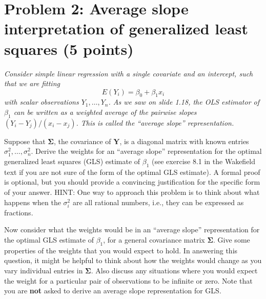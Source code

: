 \documentclass[11pt, letterpaper]{article}
\newcommand{\bY}{{\bm Y}}
\newcommand{\bSigma}{{\bm \Sigma}}
\begin{document}
{\section*{Problem 2: Average slope interpretation of generalized least squares (5 points)}
{\em Consider simple linear regression with a
single covariate and an intercept, such that we are fitting
\[
E(Y_i)=\beta_0 + \beta_1 x_i
\]
with scalar observations $Y_1,\ldots,Y_n$. As we saw on slide 1.18, the OLS estimator of $\beta_1$ can
be written as a weighted average of the pairwise slopes $(Y_i-Y_j)/(x_i-x_j)$.
This is called the ``average slope'' representation.
}
\begin{enumerate}[(a)]
{\em \item Suppose that $\bSigma$, the covariance of $\bY$, is a diagonal matrix with known entries $\sigma_1^2,\ldots,\sigma_n^2$.
Derive the weights for an ``average slope'' representation for the optimal generalized least squares (GLS) estimate of $\beta_1$ (see exercise 8.1 in the Wakefield text if you are not sure of the form of the optimal GLS estimate).  A formal proof is optional, but you should provide a convincing justification for the specific form of your answer.  HINT: One way to approach this problem is to think about what happens when the $\sigma^2_i$ are all rational numbers, i.e., they can be expressed as fractions.}
{\item Now consider what the weights would be in an ``average slope''
representation for the optimal GLS estimate of $\beta_1$, for a general covariance matrix $\bSigma$.  Give some properties of the weights that you would expect to hold.  In answering this question, it might be helpful to think about how the weights would change as you vary individual entries in $\bSigma$.
Also discuss any situations where you would expect the weight for a particular pair of observations to 
be infinite or zero.  Note that you are {\bf not} asked to derive an average slope representation for GLS.}
\end{enumerate} 


}
\end{document}
